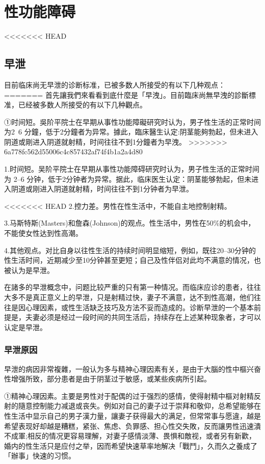 \documentclass[12pt,UTF8]{ctexbook}
\begin{document}
\part{性功能障碍}

<<<<<<< HEAD
\chapter{早泄}

目前临床尚无早泄的诊断标准，已被多数人所接受的有以下几种观点：
=======
首先讓我們來看看到底什麼是「早洩」。目前臨床尚無早洩的診斷標准，已经被多数人所接受的有以下几种觀点。

①时间短。吳阶平院士在早期从事性功能障礙研究时认为，男子性生活的正常时间为2~6 分鐘，低于2分鐘者为异常。據此，臨床醫生认定:阴茎能夠勃起，但未进入阴道或剛进入阴道就射精，时间往往不到1分鐘者为早洩。
>>>>>>> 6a778fc562d55006c4c857432af74f4b1a2a4d80

1.时间短。吴阶平院士在早期从事性功能障碍研究时认为，男子性生活的正常时间为 2--6 分钟，低于2分钟者为异常。据此，临床医生认定：阴茎能够勃起，但未进入阴道或刚进入阴道就射精，时间往往不到1分钟者为早泄。

<<<<<<< HEAD
2.控力差。男性在性生活中，不能自主地控制射精。

3.马斯特斯(Masters)和詹森(Johnson)的观点。性生活中，男性在50\%的机会中，不能使女性达到性高潮。

4.其他观点。对比自身以往性生活的持续时间明显缩短，例如，既往20--30分钟的性生活时间，近期减少至10分钟甚至更短；自己及性伴侣对此均不满意的情况，也被认为是早泄。

在諸多的早泄概念中，问题比较严重的只有第一种情况。而临床应诊的患者，往往大多不是真正意义上的早泄，只是射精过快，妻子不满意，达不到性高潮，他们往往是因心理因素，或性生活缺乏技巧及方法不妥而造成的。诊断早泄的一个基本前提是，夫妻必须是经过一段时间的共同生活后，持续存在上述某种现象者，才可以认定是早泄。

\section{早泄原因}



早泄的病因非常複雜，一般认为多与精神心理因素有关，是由于大腦的性中樞兴奋性增强所致，部分患者是由于阴茎过于敏感，或某些疾病所引起。

①精神心理因素。主要是男性对于配偶的过于强烈的感情，使得射精中樞对射精反射的隨意控制能力减退或丧失。例如对自己的妻子过于崇拜和敬仰，总希望能够在性生活中显示自己的男子漢力量，讓妻子获得最大的满足，但常常事与愿違，越是希望表现好却越是糟糕，紧张、焦虑、负罪感、担心性交失敗，反而讓男性迅速潰不成軍;相反的情况更容易理解，对妻子感情淡薄、畏惧和敵视，或者另有新歡，婚内的性生活只是应付之举，因而希望快速草率地解决「戰鬥」，久而久之養成了「辦事」快速的习惯。
\end{document}
